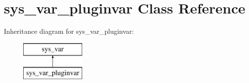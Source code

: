 \hypertarget{classsys__var__pluginvar}{}\section{sys\+\_\+var\+\_\+pluginvar Class Reference}
\label{classsys__var__pluginvar}
Inheritance diagram for sys\+\_\+var\+\_\+pluginvar\+:\begin{figure}[H]
\begin{center}
\leavevmode
\includegraphics[height=2.000000cm]{classsys__var__pluginvar}
\end{center}
\end{figure}
